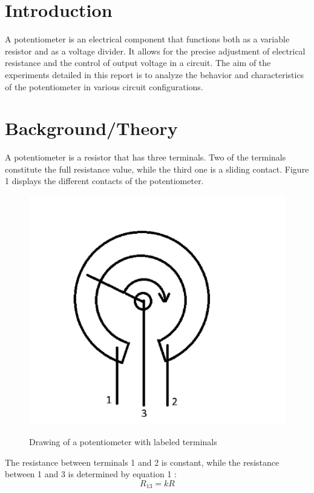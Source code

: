 \documentclass[a4paper]{article}
\begin{document}
\section{Introduction}
A potentiometer is an electrical component that functions both as a variable resistor and as a voltage divider.
It allows for the precise adjustment of electrical resistance and the control of output voltage in a circuit. 
The aim of the experiments detailed in this report is to analyze the behavior and characteristics of the potentiometer
in various circuit configurations.
\section{Background/Theory}
A potentiometer is a resistor that has three terminals. Two of the terminals
constitute the full resistance value, while the third one is a sliding contact.
Figure 1 displays the different contacts of the potentiometer.
\begin{figure}[!ht]
    \centering
    \begin{minipage}{0.4\textwidth}
        \includegraphics[width = \textwidth]{potterminals.png}
       \label{fig:1}
        \caption{\centering Drawing of a potentiometer with labeled terminals}    
    \end{minipage}
\end{figure}

The resistance between terminals 1 and 2 is constant, while the resistance
between 1 and 3 is determined by equation 1 \cite{report}:
\begin{equation}
    R_{13} = kR
\end{equation}
\end{document}
